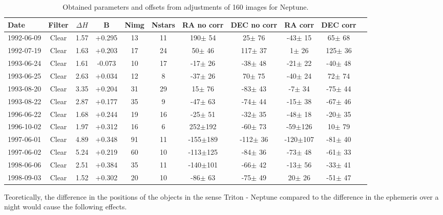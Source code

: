 \documentclass[12pt,a4paper]{report}
\begin{document}
\begin{landscape}

\begin{table}
\centering
\begin{tabular}{|l|c|c|c|c|c|c|c|c|c|c|}
\hline
Date & Filter & $\Delta H$ & B & Nimg & Nstars & RA no corr & DEC no corr & RA corr & DEC corr \\
\hline
1992-06-09 & Clear & 1.57 & +0.295 &  13 &  11 &  190$\pm$ 54 &   25$\pm$ 76 &  -43$\pm$ 15 &   65$\pm$ 68\\
1992-07-19 & Clear & 1.63 & +0.203 &  17 &  24 &   50$\pm$ 46 &  117$\pm$ 37 &    1$\pm$ 26 &  125$\pm$ 36\\
1993-06-24 & Clear & 1.61 & -0.073 &  10 &  17 &  -17$\pm$ 26 &  -38$\pm$ 48 &  -21$\pm$ 22 &  -40$\pm$ 48\\
1993-06-25 & Clear & 2.63 & +0.034 &  12 &   8 &  -37$\pm$ 26 &   70$\pm$ 75 &  -40$\pm$ 24 &   72$\pm$ 74\\
1993-08-20 & Clear & 3.35 & +0.204 &  31 &  29 &   15$\pm$ 76 &  -83$\pm$ 43 &   -7$\pm$ 34 &  -75$\pm$ 44\\
1993-08-22 & Clear & 2.87 & +0.177 &  35 &   9 &  -47$\pm$ 63 &  -74$\pm$ 44 &  -15$\pm$ 38 &  -67$\pm$ 46\\
1996-06-22 & Clear & 1.68 & +0.244 &  19 &  16 &  -25$\pm$ 51 &  -32$\pm$ 35 &  -48$\pm$ 18 &  -20$\pm$ 35\\
1996-10-02 & Clear & 1.97 & +0.312 &  16 &   6 &  252$\pm$192 &  -60$\pm$ 73 &  -59$\pm$126 &   10$\pm$ 79\\
1997-06-01 & Clear & 4.89 & +0.348 &  91 &  11 & -155$\pm$189 & -112$\pm$ 36 & -120$\pm$107 &  -81$\pm$ 40\\
1997-06-02 & Clear & 5.24 & +0.219 &  60 &  10 & -113$\pm$125 &  -84$\pm$ 36 &  -73$\pm$ 48 &  -61$\pm$ 33\\
1998-06-06 & Clear & 2.51 & +0.384 &  35 &  11 & -140$\pm$101 &  -66$\pm$ 42 &  -13$\pm$ 56 &  -33$\pm$ 41\\
1998-09-03 & Clear & 1.52 & +0.302 &  20 &  10 &  -86$\pm$ 63 &  -75$\pm$ 49 &   20$\pm$ 26 &  -51$\pm$ 47\\
\hline
\end{tabular}
\caption{Obtained parameters and offsets from adjustments of 160 images for Neptune.}
\end{table}

\end{landscape}

Teoretically, the difference in the positions of the objects in the sense Triton - Neptune compared to the difference in the ephemeris over a night would cause the following effects.
\end{document}
